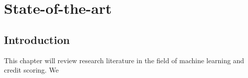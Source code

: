 
\chapter{State-of-the-art} %

\label{Chapter2} %


\section{Introduction}
This chapter will review research literature in the field of machine learning and credit scoring. We 


